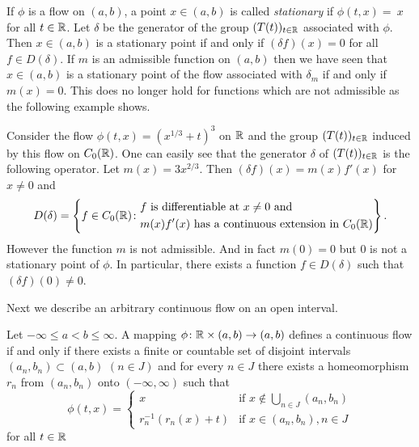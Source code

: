 \begin{remark}\label{rem:b2-3.19}
%
If $\phi$ is a flow on $(a,b)$, a point $x \in (a,b)$ is called \emph{stationary} if $\phi(t,x) =~x$ for all $t \in \mathbb{R}$.
Let $\delta$ be the generator of the group $(T(t))_{t \in \mathbb{R}}$ associated with $\phi$.
Then $x \in (a,b)$ is a stationary point if and only if $(\delta f)(x) = 0$ for all $f \in D(\delta)$.
If $m$ is an admissible function on $(a,b)$ then we have seen that $x \in (a,b)$ is a stationary point of the flow associated with $\delta_{m}$ if and only if $m(x) = 0$.
This does no longer hold for functions which are not admissible as the following example shows.
\end{remark}
\begin{example}\label{ex:b2-3.20}
%
Consider the flow $\phi(t,x) = (x^{1/3} + t)^{3}$ on $\mathbb{R}$ and the group $(T(t))_{t \in \mathbb{R}}$ induced by this flow on $C_{0}(\mathbb{R})$.
One can easily see that the generator $\delta$ of $(T(t))_{t \in \mathbb{R}}$ is the following operator.
Let $m(x) = 3x^{2/3}$.
Then $(\delta f)(x) = m(x)f'(x)$ for $x \neq 0$ and 
\begin{equation*}
D(\delta) = 
\left\{ f \in C_{0}(\mathbb{R}) \colon 
\begin{aligned}
	&f \text{ is differentiable at } x \neq 0 \text{ and } \\
	&m(x)f'(x) \text{ has a continuous extension in } C_{0}(\mathbb{R})
\end{aligned}
\right\}.
\end{equation*}
However the function $m$ is not admissible.
And in fact $m(0) = 0$ but $0$ is not a stationary point of $\phi$.
In particular, there exists a function $f \in D(\delta)$ such that $(\delta f)(0) \neq 0$.
\end{example}
Next we describe an arbitrary continuous flow on an open interval.
\begin{proposition}\label{prop:b2-3.21}
%
Let $-\infty \leq a < b \leq \infty$.
A mapping $\phi \colon \mathbb{R} \times (a,b) \to (a,b)$ defines a continuous flow if and only if there exists a finite or countable set of disjoint intervals $(a_{n},b_{n}) \subset (a,b)$ $(n \in J)$ and for every $n \in J$ there exists a homeomorphism $r_{n}$ from $(a_{n},b_{n})$ onto $(-\infty,\infty)$ such that
\begin{equation*}\label{eq:b2-flow}
\phi(t,x) = \begin{cases}
    x & \text{if } x \notin \bigcup_{n \in J} (a_{n},b_{n}) \\
    r_{n}^{-1}(r_{n}(x) + t) & \text{if } x \in (a_{n},b_{n}), n \in J
\end{cases}
\end{equation*}
for all $t \in \mathbb{R}$
\end{proposition}

